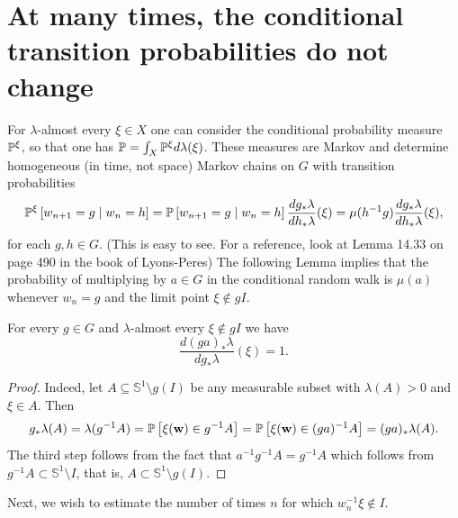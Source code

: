 \section{At many times, the conditional transition probabilities do not change}

For $\lambda$-almost every $\xi \in X$ one can consider the conditional probability measure $\P^{\xi}$, so that one has $\P=\int_{X}\P^{\xi}d\lambda(\xi)$. 
These measures are Markov and determine homogeneous (in time, not space) Markov chains on $G$ with transition probabilities
\[
\P^{\xi}\left[ w_{n+1}=g\mid w_n=h \right] =\P\left[ w_{n+1}=g\mid w_n=h\right] \frac{dg_{*}\lambda}{dh_{*}\lambda}(\xi)=\mu(h^{-1}g)\frac{dg_{*}\lambda}{dh_{*}\lambda}(\xi),
\]
for each $g,h\in G.$ 
(This is easy to see. For a reference, look at Lemma 14.33 on page 490 in the book of Lyons-Peres)
The following Lemma implies that the probability of multiplying by $a \in G$ in the conditional random walk is $\mu(a)$ whenever $w_n = g$ and the limit point $\xi \notin g I$.

\begin{lemma}\label{lem: invariant Radon nykodym derivative}
 For every $g\in G$ and $\lambda$-almost every $\xi \notin g I$ we have
	\[
	\frac{d(ga)_{*}\lambda}{dg_{*}\lambda}(\xi)=1.
	\] 
\end{lemma}
\begin{proof}
    Indeed, let $A\subseteq \mathbb{S}^1\setminus g(I)$ be any measurable subset with $\lambda(A)>0$ and $\xi \in A$. Then
    $$ g_{*}\lambda(A) =\lambda(g^{-1}A) =\P\left[ \xi(\mathbf{w})\in g^{-1}A\right] = \P\left[ \xi(\mathbf{w})\in (ga)^{-1}A\right] 
    =(ga)_{*}\lambda(A).$$
    The third step follows from the fact that $a^{-1} g^{-1}A = g^{-1}A$ which follows from $g^{-1}A \subset \mathbb{S}^1\setminus I$, that is, $A \subset \mathbb{S}^1\setminus g(I)$.
\end{proof}

Next, we wish to estimate the number of times $n$ for which $w_n^{-1} \xi \notin I$.

